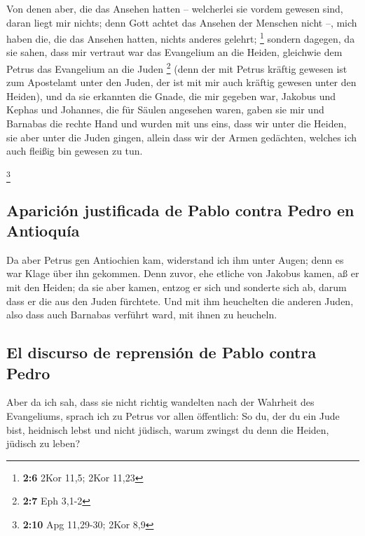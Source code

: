  Von denen aber, die das Ansehen hatten -- welcherlei sie
vordem gewesen sind, daran liegt mir nichts; denn Gott achtet das
Ansehen der Menschen nicht --, mich haben die, die das Ansehen hatten,
nichts anderes gelehrt; \footnote{\textbf{2:6} 2Kor 11,5; 2Kor 11,23}
 sondern dagegen, da sie sahen, dass mir vertraut war das
Evangelium an die Heiden, gleichwie dem Petrus das Evangelium an die
Juden \footnote{\textbf{2:7} Eph 3,1-2}  (denn der mit
Petrus kräftig gewesen ist zum Apostelamt unter den Juden, der ist mit
mir auch kräftig gewesen unter den Heiden),  und da sie
erkannten die Gnade, die mir gegeben war, Jakobus und Kephas und
Johannes, die für Säulen angesehen waren, gaben sie mir und Barnabas die
rechte Hand und wurden mit uns eins, dass wir unter die Heiden, sie aber
unter die Juden gingen,  allein dass wir der Armen
gedächten, welches ich auch fleißig bin gewesen zu tun.

\footnote{\textbf{2:10} Apg 11,29-30; 2Kor 8,9}

\hypertarget{apariciuxf3n-justificada-de-pablo-contra-pedro-en-antioquuxeda}{%
\subsection{Aparición justificada de Pablo contra Pedro en
Antioquía}\label{apariciuxf3n-justificada-de-pablo-contra-pedro-en-antioquuxeda}}

 Da aber Petrus gen Antiochien kam, widerstand ich ihm
unter Augen; denn es war Klage über ihn gekommen.  Denn
zuvor, ehe etliche von Jakobus kamen, aß er mit den Heiden; da sie aber
kamen, entzog er sich und sonderte sich ab, darum dass er die aus den
Juden fürchtete.  Und mit ihm heuchelten die anderen
Juden, also dass auch Barnabas verführt ward, mit ihnen zu heucheln.

\hypertarget{el-discurso-de-reprensiuxf3n-de-pablo-contra-pedro}{%
\subsection{El discurso de reprensión de Pablo contra
Pedro}\label{el-discurso-de-reprensiuxf3n-de-pablo-contra-pedro}}

 Aber da ich sah, dass sie nicht richtig wandelten nach
der Wahrheit des Evangeliums, sprach ich zu Petrus vor allen öffentlich:
So du, der du ein Jude bist, heidnisch lebst und nicht jüdisch, warum
zwingst du denn die Heiden, jüdisch zu leben?

